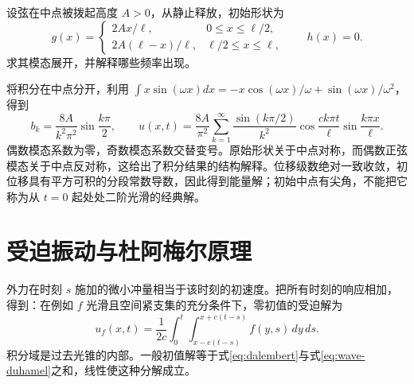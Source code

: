 \documentclass[UTF8,12pt,a4paper,fontset=fandol]{ctexbook}
\begin{document}
\begin{example}[在中点拨起后释放]
设弦在中点被拨起高度 $A>0$，从静止释放，初始形状为
\[
 g(x)=\begin{cases}2Ax/\ell,&0\le x\le\ell/2,\\
 2A(\ell-x)/\ell,&\ell/2\le x\le\ell,
 \end{cases}\qquad h(x)=0.
\]
求其模态展开，并解释哪些频率出现。
\end{example}
\begin{solve}
将积分在中点分开，利用 $\int x\sin(\omega x)dx=-x\cos(\omega x)/\omega+\sin(\omega x)/\omega^2$，得到
\[
 b_k=\frac{8A}{k^2\pi^2}\sin\frac{k\pi}{2},\qquad
 u(x,t)=\frac{8A}{\pi^2}\sum_{k=1}^\infty
 \frac{\sin(k\pi/2)}{k^2}\cos\frac{ck\pi t}{\ell}\sin\frac{k\pi x}{\ell}.
\]
偶数模态系数为零，奇数模态系数交替变号。原始形状关于中点对称，而偶数正弦模态关于中点反对称，这给出了积分结果的结构解释。位移级数绝对一致收敛，初位移具有平方可积的分段常数导数，因此得到能量解；初始中点有尖角，不能把它称为从 $t=0$ 起处处二阶光滑的经典解。
\end{solve}

\section{受迫振动与杜阿梅尔原理}
外力在时刻 $s$ 施加的微小冲量相当于该时刻的初速度。把所有时刻的响应相加，得到：在例如 $f$ 光滑且空间紧支集的充分条件下，零初值的受迫解为
\begin{equation}
 u_f(x,t)=\frac1{2c}\int_0^t\int_{x-c(t-s)}^{x+c(t-s)}f(y,s)\,dy\,ds.
 \label{eq:wave-duhamel}
\end{equation}
积分域是过去光锥的内部。一般初值解等于式\eqref{eq:dalembert}与式\eqref{eq:wave-duhamel}之和，线性使这种分解成立。
\end{document}

